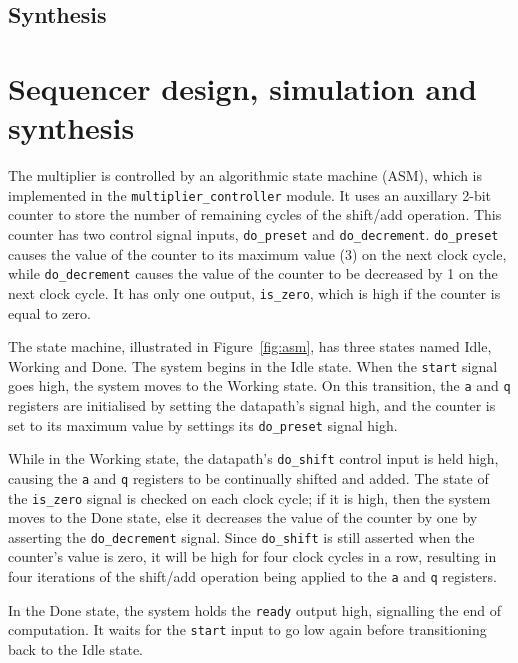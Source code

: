 \documentclass[a4paper]{article}
\begin{document}
\subsection{Synthesis}
\label{sec:reg:synth}


\section{Sequencer design, simulation and synthesis}
\label{sec:seq}

The multiplier is controlled by an algorithmic state machine (ASM), which is implemented in the \texttt{multiplier\_controller} module. It uses an auxillary 2-bit counter to store the number of remaining cycles of the shift/add operation. This counter has two control signal inputs, \texttt{do\_preset} and \texttt{do\_decrement}. \texttt{do\_preset} causes the value of the counter to its maximum value (3) on the next clock cycle, while \texttt{do\_decrement} causes the value of the counter to be decreased by 1 on the next clock cycle. It has only one output, \texttt{is\_zero}, which is high if the counter is equal to zero.

The state machine, illustrated in Figure~\ref{fig:asm}, has three states named Idle, Working and Done. The system begins in the Idle state. When the \texttt{start} signal goes high, the system moves to the Working state. On this transition, the \texttt{a} and \texttt{q} registers are initialised by setting the datapath's  signal high, and the counter is set to its maximum value by settings its \texttt{do\_preset} signal high.

While in the Working state, the datapath's \texttt{do\_shift} control input is held high, causing the \texttt{a} and \texttt{q} registers to be continually shifted and added. The state of the \texttt{is\_zero} signal is checked on each clock cycle; if it is high, then the system moves to the Done state, else it decreases the value of the counter by one by asserting the \texttt{do\_decrement} signal. Since \texttt{do\_shift} is still asserted when the counter's value is zero, it will be high for four clock cycles in a row, resulting in four iterations of the shift/add operation being applied to the \texttt{a} and \texttt{q} registers.

In the Done state, the system holds the \texttt{ready} output high, signalling the end of computation. It waits for the \texttt{start} input to go low again before transitioning back to the Idle state.
\end{document}
